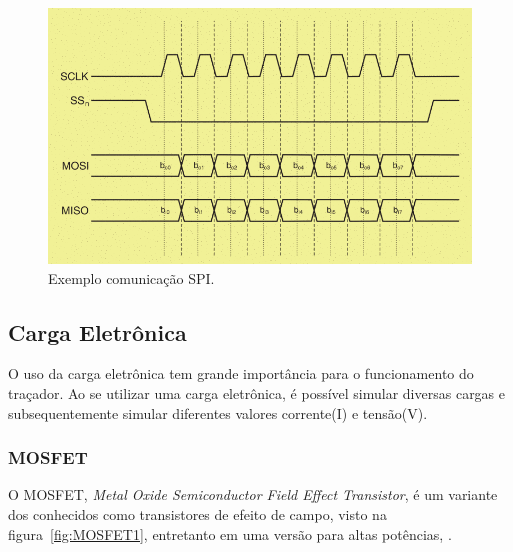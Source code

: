 \FloatBarrier
\begin{figure}[!htbp]
	\centering
	\includegraphics[scale=0.7]{imagens/SPI}
	\caption{Exemplo comunicação SPI. %
	}
	\label{fig:SPI}
\end{figure}
\FloatBarrier



\subsection{Carga Eletrônica}

O uso da carga eletrônica tem grande importância para o funcionamento do traçador. Ao se utilizar uma carga eletrônica, é possível simular diversas cargas e subsequentemente simular diferentes valores corrente(I) e tensão(V).

\subsubsection{MOSFET}

O MOSFET, \textit{Metal Oxide Semiconductor Field Effect Transistor}, é um variante dos conhecidos como transistores de efeito de campo, visto na figura~\ref{fig:MOSFET1}, entretanto em uma versão para altas potências, \cite{ART977}.


